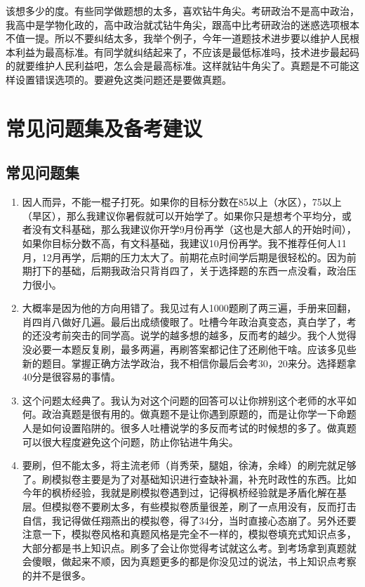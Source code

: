 \documentclass[lang=cn,newtx,10pt,scheme=chinese,pad,twocol]{zznote}
\begin{document}
\begin{definition}[该想多少的度]
	该想多少的度。有些同学做题想的太多，喜欢钻牛角尖。考研政治不是高中政治，我高中是学物化政的，高中政治就忒钻牛角尖，跟高中比考研政治的迷惑选项根本不值一提。所以不要纠结太多，我举个例子，今年一道题技术进步要以维护人民根本利益为最高标准。有同学就纠结起来了，不应该是最低标准吗，技术进步最起码的就要维护人民利益吧，怎么会是最高标准。这样就钻牛角尖了。真题是不可能这样设置错误选项的。要避免这类问题还是要做真题。
\end{definition}

\chapter{常见问题集及备考建议}
\section{常见问题集}
\begin{enumerate}[itemsep=1.3ex]
	\item {}
	      因人而异，不能一棍子打死。如果你的目标分数在85以上（水区），75以上（旱区），那么我建议你暑假就可以开始学了。如果你只是想考个平均分，或者没有文科基础，那么我建议你开学9月份再学（这也是大部人的开始时间），如果你目标分数不高，有文科基础，我建议10月份再学。我不推荐任何人11月，12月再学，后期的压力太大了。前期花点时间学后期是很轻松的。因为前期打下的基础，后期我政治只背肖四了，关于选择题的东西一点没看，政治压力很小。
	\item {}
	      大概率是因为他的方向用错了。我见过有人1000题刷了两三遍，手册来回翻，肖四肖八做好几遍。最后出成绩傻眼了。吐槽今年政治真变态，真白学了，考的还没考前突击的同学高。说学的越多想的越多，反而考的越少。我个人觉得没必要一本题反复刷，最多两遍，再刷答案都记住了还刷他干啥。应该多见些新的题目。掌握正确方法学政治，我不相信你最后会考30，20来分。选择题拿40分是很容易的事情。
	\item {}
	      这个问题太经典了。我认为对这个问题的回答可以让你辨别这个老师的水平如何。政治真题是很有用的。做真题不是让你遇到原题的，而是让你学一下命题人是如何设置陷阱的。很多人吐槽说学的多反而考试的时候想的多了。做真题可以很大程度避免这个问题，防止你钻进牛角尖。
	\item {}
	      要刷，但不能太多，将主流老师（肖秀荣，腿姐，徐涛，余峰）的刷完就足够了。刷模拟卷主要是为了对基础知识进行查缺补漏，补充时政性的东西。比如今年的枫桥经验，我就是刷模拟卷遇到过，记得枫桥经验就是矛盾化解在基层。但模拟卷不要刷太多，有些模拟卷质量很差，刷了一点用没有，反而打击自信，我记得做任翔燕出的模拟卷，得了34分，当时直接心态崩了。另外还要注意一下，模拟卷风格和真题风格是完全不一样的，模拟卷填充式知识点多，大部分都是书上知识点。刷多了会让你觉得考试就这么考。到考场拿到真题就会傻眼，做起来不顺，因为真题更多的都是你没见过的说法，书上知识点考察的并不是很多。{\par}
\end{enumerate}
\vspace{1em}
\end{document}
